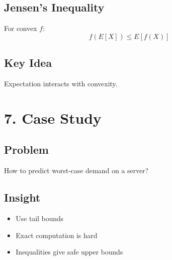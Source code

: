 \documentclass{article}
\begin{document}
\subsection*{Jensen's Inequality}
For convex $f$:
\[
f(E[X]) \le E[f(X)]
\]

\subsection*{Key Idea}
Expectation interacts with convexity.

\section*{7. Case Study}

\subsection*{Problem}
How to predict worst-case demand on a server?

\subsection*{Insight}
\begin{itemize}
    \item Use tail bounds
    \item Exact computation is hard
    \item Inequalities give safe upper bounds
\end{itemize}
\end{document}
